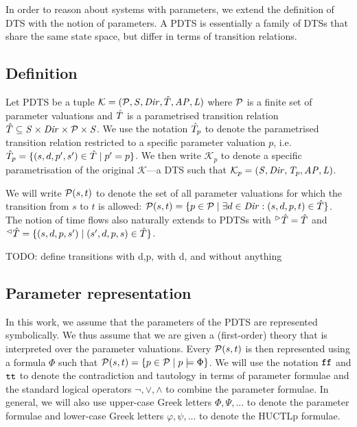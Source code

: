 In order to reason about systems with parameters, we extend the definition of \ac{DTS} with the notion of parameters. A \ac{PDTS} is essentially a family of \acp{DTS} that share the same state space, but differ in terms of transition relations. 

\subsection{Definition}

Let \acl{PDTS} be a tuple $\mathcal{K} = (\mathcal{P}, \mathit{S}, \mathit{Dir}, \hat{T}, \mathit{AP}, \mathit{L})$  where $\mathcal{P}$ is a finite set of parameter valuations and $\hat{T}$ is a parametrised transition relation $\hat{T} \subseteq \mathit{S} \times \mathit{Dir} \times \mathcal{P} \times \mathit{S}$. We use the notation $\hat{T}_p$ to denote the parametrised transition relation restricted to a specific parameter valuation $p$, i.e. $\hat{T}_p = \{ (s, d, p', s') \in \hat{T} \mid p' = p \}$.  We then write $\mathcal{K}_p$ to denote a specific parametrisation of the original $\mathcal{K}$—a \ac{DTS} such that $\mathcal{K}_p = (\mathit{S}, \mathit{Dir}, \mathit{T}_p, \mathit{AP}, \mathit{L})$. 

We will write $\mathcal{P}(s, t)$ to denote the set of all parameter valuations for which the transition from $s$ to $t$ is allowed: $\mathcal{P}(s, t) = \{ p \in \mathcal{P} \mid \exists d \in \mathit{Dir} : (s, d, p, t) \in \hat{T} \}$. The notion of time flows also naturally extends to \acp{PDTS} with ${}^\vartriangleright\hat{T} = \hat{T}$ and ${}^\vartriangleleft\hat{T} = \{ (s, d, p, s') \mid (s', d, p, s) \in \hat{T} \}$.

TODO: define transitions with d,p, with d, and without anything

\subsection{Parameter representation}

In this work, we assume that the parameters of the \ac{PDTS} are represented symbolically. We thus assume that we are given a (first-order) theory that is interpreted over the parameter valuations. Every $\mathcal{P}(s, t)$ is then represented using a formula $\Phi$ such that $\mathcal{P}(s, t) = \{ p \in \mathcal{P} \mid p \models \Phi \}$. We will use the notation $\texttt{ff}$ and $\texttt{tt}$ to denote the contradiction and tautology in terms of parameter formulae and the standard logical operators $\neg, \lor, \land$ to combine the parameter formulae. In general, we will also use upper-case Greek letters $\Phi, \Psi, ...$ to denote the parameter formulae and lower-case Greek letters $\varphi, \psi, ...$ to denote the \ac{HUCTLp} formulae.

